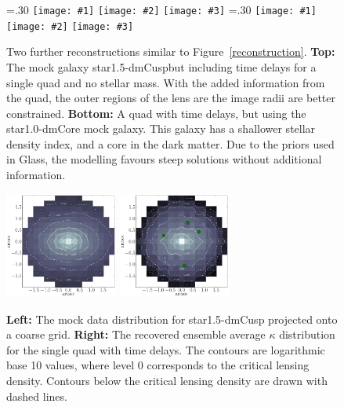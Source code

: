 \documentclass[galley,usenatbib]{mn2e}
\newcommand{\Glass}{{\sc Glass}}
\newcommand{\figref}[1] {Figure~\ref{#1}}
\newcommand{\mockAA}{{\sc star1.0-dmCore}}
\newcommand{\mockBC}{{\sc star1.5-dmCusp}}
\newcommand\plotthree[3]{{%
 \centering
 \leavevmode
 \columnwidth=.30\textwidth
 \texttt{[image: \#1]}%
 \hfil
 \texttt{[image: \#2]}%
 \hfil
 \texttt{[image: \#3]}%
}}%
\begin{document}
\begin{figure}
  \plotthree{BCQuadR1a_Tms-a.pdf} {BCQuadR1a_Tms-b.pdf} {BCQuadR1a_Tms-c.pdf}
  \plotthree{AAQuadR1a_Tms-a.pdf} {AAQuadR1a_Tms-b.pdf} {AAQuadR1a_Tms-c.pdf}
\caption{
    Two further reconstructions similar to \figref{reconstruction}.
    \textbf{Top:} The mock galaxy \mockBC but including time delays for a
    single quad and no stellar mass. With the added information from the quad,
    the outer regions of the lens are the image radii are better constrained.
    \textbf{Bottom:} A quad with time delays, but using the \mockAA{} mock
    galaxy. This galaxy has a shallower stellar density index, and a core in
    the dark matter. Due to the priors used in \Glass, the modelling favours
    steep solutions without additional information.
}
\label{reconstruction 2}
\end{figure}

\begin{figure}
\includegraphics[width=0.33\textwidth]{BCQuadR1a_TmS-kappa-b.pdf}
\includegraphics[width=0.33\textwidth]{BCQuadR1a_TmS-kappa-a.pdf}
\caption{ \textbf{Left:} The mock data distribution for \mockBC{} projected
onto a coarse grid.  \textbf{Right:} The recovered ensemble average $\kappa$
distribution for the single quad with time delays. The contours are logarithmic
base 10 values, where level 0 corresponds to the critical lensing density. Contours
below the critical lensing density are drawn with dashed lines.}
\label{2d mass reconstruction}
\end{figure}
\end{document}
